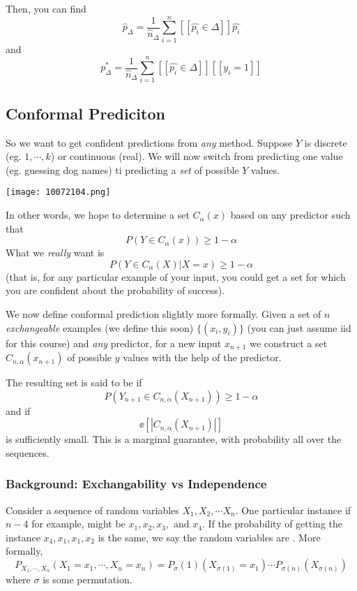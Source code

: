 \documentclass[11pt]{scrartcl}
\begin{document}
Then, you can find $$\hat{p}_\Delta = \frac{1}{\hat{n}_{\Delta}}\sum_{i=1}^{n}[[\hat{p_i}\in \Delta]]\hat{p_i}$$
and 
$$p^*_\Delta = \frac{1}{\hat{n}_\Delta}\sum_{i=1}^{n}[[\hat{p_i} \in \Delta]][[y_i=1]]$$

\subsection{Conformal Prediciton}

So we want to get confident predictions from \textit{any} method. Suppose $Y$ is discrete (eg. $1,\cdots, k$) or continuous (real). We will now switch from predicting one value (eg. guessing dog names) ti predicting a \textit{set} of possible $Y$ values. 
\begin{center}
    \texttt{[image: 10072104.png]}
\end{center}
In other words, we hope to determine a set $C_\alpha(x)$ based on any predictor such that $$P(Y \in C_\alpha(x)) \ge 1-\alpha$$
What we \textit{really} want is $$P(Y \in C_\alpha(X)|X=x) \ge 1-\alpha$$ (that is, for any particular example of your input, you could get a set for which you are confident about the probability of success). 

We now define conformal prediction slightly more formally. Given a set of $n$ \textit{exchangeable} examples (we define this soon) $\{(x_i,y_i)\}$ (you can just assume iid for this course) and \textit{any} predictor, for a new input $x_{n+1}$ we construct a set $C_{n,\alpha}(x_{n+1})$ of possible $y$ values with the help of the predictor. 

\begin{defn}
The resulting set is said to be  if $$P(Y_{n+1} \in C_{n,\alpha}(X_{n+1})) \ge 1-\alpha$$ and  if
$$\ee[|C_{n,\alpha}(X_{n+1})|]$$ is sufficiently small. This is a marginal guarantee, with probability all over the sequences. 
\end{defn}

\subsubsection{Background: Exchangability vs Independence}
Consider a sequence of random variables $X_1,X_2, \cdots X_n$. One particular instance if $n-4$ for example, might be $x_1,x_2,x_3,$ and $x_4$. If the probability of getting the instance $x_4,x_1,x_1,x_2$ is the same, we say the random variables are . More formally, 
$$P_{X_1,\cdots,X_n}(X_1=x_1,\cdots,X_n=x_n)=P_\sigma(1)(X_{\sigma(1)}=x_1)\cdots{P_{\sigma(n)}(X_{\sigma(n)})}$$
where $\sigma$ is some permutation.
\end{document}
